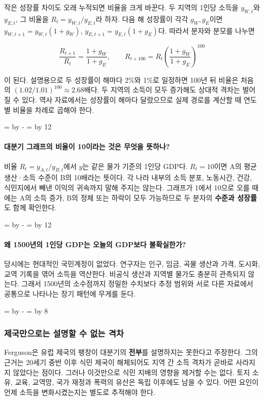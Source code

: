 \documentclass[10pt,a4paper]{article}
\newcommand{\ReserveQuestionSpace}{%
  \par\begingroup
  \dimen0=\pagegoal \advance\dimen0 by -\pagetotal
  \dimen2=\baselineskip \multiply\dimen2 by 12
  \ifdim\dimen0<\dimen2 \newpage\fi
  \endgroup}
\newcommand{\ReserveReadingSectionSpace}{%
  \par\begingroup
  \dimen0=\pagegoal \advance\dimen0 by -\pagetotal
  \dimen2=\baselineskip \multiply\dimen2 by 8
  \ifdim\dimen0<\dimen2 \newpage\fi
  \endgroup}
\begin{document}
작은 성장률 차이도 오래 누적되면 비율을 크게 바꾼다. 두 지역의 1인당 소득을 $y_{W,t}$와 $y_{E,t}$, 그 비율을 $R_t=y_{W,t}/y_{E,t}$라 하자. 다음 해 성장률이 각각 $g_W,g_E$이면 $y_{W,t+1}=y_{W,t}(1+g_W)$, $y_{E,t+1}=y_{E,t}(1+g_E)$다. 따라서 분자와 분모를 나누면\par

\[
\frac{R_{t+1}}{R_t}=\frac{1+g_W}{1+g_E},\qquad
R_{t+100}=R_t\left(\frac{1+g_W}{1+g_E}\right)^{100}
\]

이 된다. 설명용으로 두 성장률이 해마다 2\%와 1\%로 일정하면 100년 뒤 비율은 처음의 $(1.02/1.01)^{100}\approx2.68$배다. 두 지역의 소득이 모두 증가해도 상대적 격차는 벌어질 수 있다. 역사 자료에서는 성장률이 해마다 달랐으므로 실제 경로를 계산할 때 연도별 비율을 차례로 곱해야 한다.\par

\ReserveQuestionSpace
\paragraph{대분기 그래프의 비율이 10이라는 것은 무엇을 뜻하나?}
비율 $R_t=y_{A,t}/y_{B,t}$에서 $y$는 같은 물가 기준의 1인당 GDP다. $R_t=10$이면 A의 평균 생산·소득 수준이 B의 10배라는 뜻이다. 각 나라 내부의 소득 분포, 노동시간, 건강, 식민지에서 빼낸 이익의 귀속까지 말해 주지는 않는다. 그래프가 1에서 10으로 오를 때에는 A의 소득 증가, B의 정체 또는 하락이 모두 가능하므로 두 분자의 \textbf{수준과 성장률}도 함께 확인한다.\par

\ReserveQuestionSpace
\paragraph{왜 1500년의 1인당 GDP는 오늘의 GDP보다 불확실한가?}
당시에는 현대적인 국민계정이 없었다. 연구자는 인구, 임금, 곡물 생산과 가격, 도시화, 교역 기록을 엮어 소득을 역산한다. 비공식 생산과 지역별 물가도 충분히 관측되지 않는다. 그래서 1500년의 소수점까지 정밀한 수치보다 추정 범위와 서로 다른 자료에서 공통으로 나타나는 장기 패턴에 무게를 둔다.\par

\ReserveReadingSectionSpace
\subsubsection*{제국만으로는 설명할 수 없는 격차}

Ferguson은 유럽 제국의 팽창이 대분기의 \textbf{전부}를 설명하지는 못한다고 주장한다. 그의 근거는 20세기 중반 이후 식민 제국이 해체되어도 지역 간 소득 격차가 곧바로 사라지지 않았다는 점이다. 그러나 이것만으로 식민 지배의 영향을 제거할 수는 없다. 토지 소유, 교육, 교역망, 국가 재정과 폭력의 유산은 독립 이후에도 남을 수 있다. 어떤 요인이 언제 소득을 변화시켰는지는 별도로 추적해야 한다.\par
\end{document}
